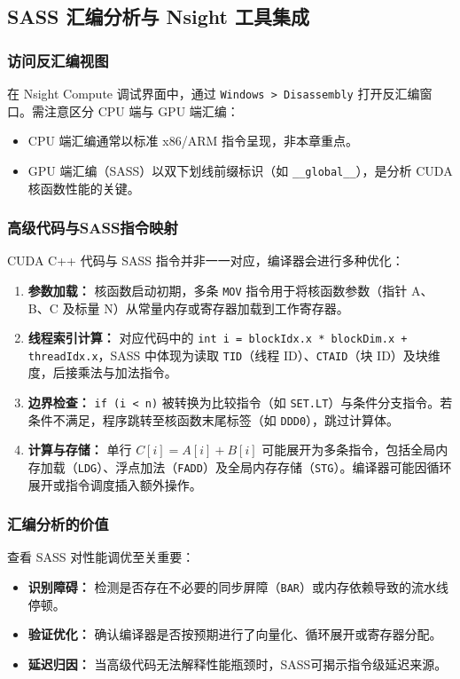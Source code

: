 \subsection{SASS 汇编分析与 Nsight 工具集成}

\subsubsection{访问反汇编视图}
在 Nsight Compute 调试界面中，通过 \texttt{Windows > Disassembly} 打开反汇编窗口。需注意区分 CPU 端与 GPU 端汇编：
\begin{itemize}
    \item CPU 端汇编通常以标准 x86/ARM 指令呈现，非本章重点。
    \item GPU 端汇编（SASS）以双下划线前缀标识（如 \texttt{\_\_global\_\_}），是分析 CUDA 核函数性能的关键。
\end{itemize}

\subsubsection{高级代码与SASS指令映射}
CUDA C++ 代码与 SASS 指令并非一一对应，编译器会进行多种优化：
\begin{enumerate}
    \item \textbf{参数加载：} 核函数启动初期，多条 \texttt{MOV} 指令用于将核函数参数（指针 A、B、C 及标量 N）从常量内存或寄存器加载到工作寄存器。
    \item \textbf{线程索引计算：} 对应代码中的 \texttt{int i = blockIdx.x * blockDim.x + threadIdx.x}，SASS 中体现为读取 \texttt{TID}（线程 ID）、\texttt{CTAID}（块 ID）及块维度，后接乘法与加法指令。
    \item \textbf{边界检查：} \texttt{if (i < n)} 被转换为比较指令（如 \texttt{SET.LT}）与条件分支指令。若条件不满足，程序跳转至核函数末尾标签（如 \texttt{DDD0}），跳过计算体。
    \item \textbf{计算与存储：} 单行 $C[i] = A[i] + B[i]$ 可能展开为多条指令，包括全局内存加载（\texttt{LDG}）、浮点加法（\texttt{FADD}）及全局内存存储（\texttt{STG}）。编译器可能因循环展开或指令调度插入额外操作。
\end{enumerate}

\subsubsection{汇编分析的价值}
查看 SASS 对性能调优至关重要：
\begin{itemize}
    \item \textbf{识别障碍：} 检测是否存在不必要的同步屏障（\texttt{BAR}）或内存依赖导致的流水线停顿。
    \item \textbf{验证优化：} 确认编译器是否按预期进行了向量化、循环展开或寄存器分配。
    \item \textbf{延迟归因：} 当高级代码无法解释性能瓶颈时，SASS可揭示指令级延迟来源。
\end{itemize}

